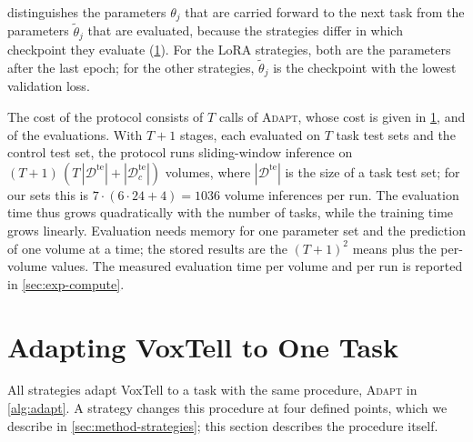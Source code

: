  distinguishes the parameters $\theta_j$ that are carried forward to the next task from the parameters $\tilde{\theta}_j$ that are evaluated, because the strategies differ in which checkpoint they evaluate (\cref{sec:method-adaptation}).
For the LoRA strategies, both are the parameters after the last epoch; for the other strategies, $\tilde{\theta}_j$ is the checkpoint with the lowest validation loss.

The cost of the protocol consists of $T$ calls of \textsc{Adapt}, whose cost is given in \cref{sec:method-adaptation}, and of the evaluations.
With $T+1$ stages, each evaluated on $T$ task test sets and the control test set, the protocol runs sliding-window inference on $(T+1)\,(T\,|\mathcal{D}^{\mathrm{te}}| + |\mathcal{D}_c^{\mathrm{te}}|)$ volumes, where $|\mathcal{D}^{\mathrm{te}}|$ is the size of a task test set; for our sets this is $7 \cdot (6 \cdot 24 + 4) = 1036$ volume inferences per run.
The evaluation time thus grows quadratically with the number of tasks, while the training time grows linearly.
Evaluation needs memory for one parameter set and the prediction of one volume at a time; the stored results are the $(T+1)^2$ means plus the per-volume values.
The measured evaluation time per volume and per run is reported in \cref{sec:exp-compute}.

\section{Adapting VoxTell to One Task}
\label{sec:method-adaptation}

All strategies adapt VoxTell to a task with the same procedure, \textsc{Adapt} in \cref{alg:adapt}.
A strategy changes this procedure at four defined points, which we describe in \cref{sec:method-strategies}; this section describes the procedure itself.

